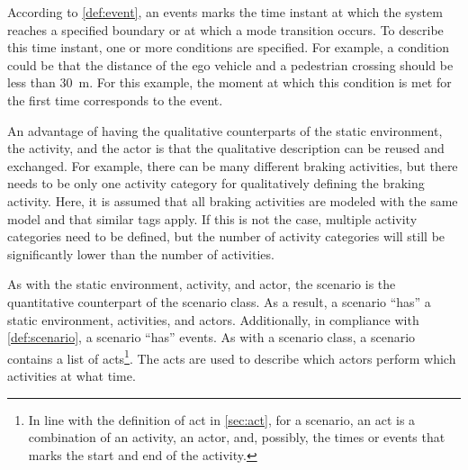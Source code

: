 According to \cref{def:event}, an events marks the time instant at which the system reaches a specified boundary or at which a mode transition occurs. To describe this time instant, one or more conditions are specified. For example, a condition could be that the distance of the ego vehicle and a pedestrian crossing should be less than \SI{30}{\meter}. For this example, the moment at which this condition is met for the first time corresponds to the event.

An advantage of having the qualitative counterparts of the static environment, the activity, and the actor is that the qualitative description can be reused and exchanged. For example, there can be many different braking activities, but there needs to be only one activity category for qualitatively defining the braking activity. Here, it is assumed that all braking activities are modeled with the same model and that similar tags apply. If this is not the case, multiple activity categories need to be defined, but the number of activity categories will still be significantly lower than the number of activities.

As with the static environment, activity, and actor, the scenario is the quantitative counterpart of the scenario class. As a result, a scenario ``has'' a static environment, activities, and actors. Additionally, in compliance with \cref{def:scenario}, a scenario ``has'' events. As with a scenario class, a scenario contains a list of acts\cbstartc\footnote{\cbstartc In line with the definition of act in \cref{sec:act}, for a scenario, an act is a combination of an activity, an actor, and, possibly, the times or events that marks the start and end of the activity.\cbend}. The acts are used to describe which actors perform which activities at what time.\cbend
